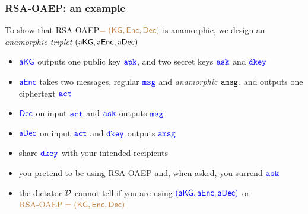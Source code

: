 \documentclass[]{beamer}
\begin{document}
\begin{frame}
\frametitle{RSA-OAEP: an example}

To show that 
{\color{brown} RSA-OAEP}$\color{brown}=({\mathsf{KG}},{\mathsf{Enc}},{\mathsf{Dec}})$ is {\color{red} anamorphic},
we design an {\color{blue}\em anamorphic triplet $({\mathsf{a}}{\mathsf{KG}},{\mathsf{a}}{\mathsf{Enc}},{\mathsf{a}}{\mathsf{Dec}})$}

\vfill

\begin{itemize}
\item $\color{blue} {\mathsf{a}}{\mathsf{KG}}$ outputs one public key $\color{blue} {\mathtt{a}}{\mathtt{pk}}$, and two secret keys $\color{blue} {\mathtt{a}}{\mathtt{sk}}$ and $\color{blue} {\mathtt{dkey}}$
\item $\color{blue} {\mathsf{a}}{\mathsf{Enc}}$ takes two messages, regular $\color{blue} {\mathtt{msg}}$ and {\em \color{blue} anamorphic ${\mathtt{a}}{\mathtt{msg}}$}, 
and outputs one ciphertext $\color{blue} {\mathtt{a}}{\mathtt{ct}}$
\item $\color{blue} {\mathsf{Dec}}$ on input $\color{blue} {\mathtt{a}}{\mathtt{ct}}$ and $\color{blue} {\mathtt{a}}{\mathtt{sk}}$ outputs $\color{blue} {\mathtt{msg}}$
\item $\color{blue} {\mathsf{a}}{\mathsf{Dec}}$ on input $\color{blue} {\mathtt{a}}{\mathtt{ct}}$ and $\color{blue} {\mathtt{dkey}}$ outputs $\color{blue} {\mathtt{a}}{\mathtt{msg}}$

\vskip 1cm
\item share $\color{blue}{\mathtt{dkey}}$ with your intended recipients
\item you pretend to be using 
{\color{blue} RSA-OAEP} and, when asked, you surrend $\color{blue} {\mathtt{a}}{\mathtt{sk}}$

\item the dictator $\mathcal{D}$ cannot tell if you are using
$\color{blue}({\mathsf{a}}{\mathsf{KG}},{\mathsf{a}}{\mathsf{Enc}},{\mathsf{a}}{\mathsf{Dec}})$
or
$\color{brown}\text{RSA-OAEP}=({\mathsf{KG}},{\mathsf{Enc}},{\mathsf{Dec}})$

\end{itemize}

\end{frame}
\end{document}
